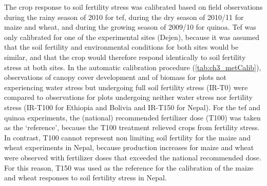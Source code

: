 The crop response to soil fertility stress was calibrated based on field observations during the rainy season of 2010 for tef, during the dry season of 2010/11 for maize and wheat, and during the growing season of 2009/10 for quinoa. Tef was only calibrated for one of the experimental sites (Dejen), because it was assumed that the soil fertility and environmental conditions for both sites would be similar, and that the crop would therefore respond identically to soil fertility stress at both sites. In the automatic calibration procedure (\autoref{tab:ch3_metCalib}), observations of canopy cover development and of biomass for plots not experiencing water stress but undergoing full soil fertility stress (IR-T0) were compared to observations for plots undergoing neither water stress nor fertility stress (IR-T100 for Ethiopia and Bolivia and IR-T150 for Nepal). For the tef and quinoa experiments, the (national) recommended fertilizer dose (T100) was taken as the `reference', because the T100 treatment relieved crops from fertility stress. In contrast, T100 cannot represent non limiting soil fertility for the maize and wheat experiments in Nepal, because production increases for maize and wheat were observed with fertilizer doses that exceeded the national recommended dose. For this reason, T150 was used as the reference for the calibration of the maize and wheat responses to soil fertility stress in Nepal. 


